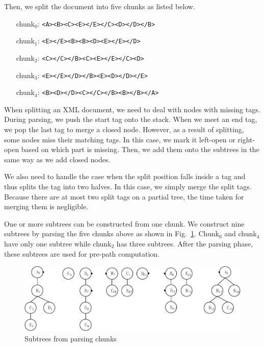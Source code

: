 Then, we split the document into five chunks as listed below.

\begin{itemize}
	\item[chunk$_0$:] \texttt{<B><C><E></E></C><D></D></B>}
	\item[chunk$_1$:] \texttt{</E><B><B><D><E></E></D>}
	\item[chunk$_2$:] \texttt{</C></B><C><E></E></C><D>}
	\item[chunk$_3$:] \texttt{</E></D></B><E><D></D></E>}
	\item[chunk$_4$:] \texttt{<D></D><C></C></B><B></B></A>}
\end{itemize}

When splitting an XML document, we need to deal with nodes with missing tags.
During parsing, we push the start tag onto the stack. When we meet an
end tag, we pop the last tag to merge a closed node. However, as a result of splitting, 
some nodes miss their matching tags. In this case, we  
mark it left-open or right-open based on which part is missing. Then, we add them onto 
the subtrees in the same way as we add closed nodes.

We also need to handle the case when the split position falls inside a tag 
and thus splits the tag into two halves.
In this case, we simply merge the split tags. 
Because there are at most two split tags on a partial tree, 
the time taken for merging them is negligible. 

One or more subtrees can be constructed from one chunk.
We construct nine subtrees by parsing the five chunks above as shown in  Fig.~\ref{fig:partialtree-notfinished}.
Chunk$_0$ and chunk$_4$ have only one subtree while chunk$_2$ has three subtrees.
After the parsing phase, these subtrees are used for pre-path computation.

\begin{figure}[t]
	\centering\includegraphics[]{partialtree/figures/fromWord-6.pdf}
	\caption{Subtrees from parsing chunks}
	\label{fig:partialtree-notfinished}
\end{figure}



